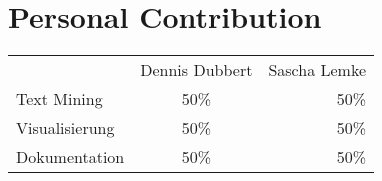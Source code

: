 \section{Personal Contribution}

\begin{tabular}{ l c r }
  & Dennis Dubbert & Sascha Lemke \\
  Text Mining & 50\% & 50\% \\
  Visualisierung & 50\% & 50\% \\
  Dokumentation & 50\% & 50\% \\
\end{tabular}